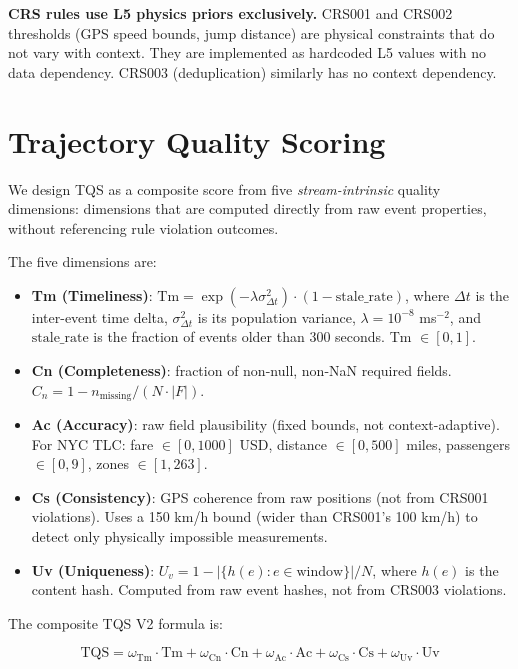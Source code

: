 \textbf{CRS rules use L5 physics priors exclusively.} CRS001 and CRS002
thresholds (GPS speed bounds, jump distance) are physical constraints that
do not vary with context. They are implemented as hardcoded L5 values
with no data dependency. CRS003 (deduplication) similarly has no context
dependency.

\section{Trajectory Quality Scoring}
\label{sec:tqs-design}

We design TQS as a composite score from five \textit{stream-intrinsic}
quality dimensions: dimensions that are computed directly from raw event
properties, without referencing rule violation outcomes.

The five dimensions are:

\begin{itemize}
  \item \textbf{Tm (Timeliness)}: $\text{Tm} = \exp(-\lambda \sigma^{2}_{\Delta t})
        \cdot (1 - \text{stale\_rate})$, where $\Delta t$ is the inter-event
        time delta, $\sigma^{2}_{\Delta t}$ is its population variance,
        $\lambda = 10^{-8}$ ms$^{-2}$, and $\text{stale\_rate}$ is the
        fraction of events older than 300 seconds. Tm $\in [0, 1]$.
  \item \textbf{Cn (Completeness)}: fraction of non-null, non-NaN required
        fields. $C_n = 1 - n_{\text{missing}} / (N \cdot |F|)$.
  \item \textbf{Ac (Accuracy)}: raw field plausibility (fixed bounds, not
        context-adaptive). For NYC TLC: fare $\in [0, 1000]$ USD, distance
        $\in [0, 500]$ miles, passengers $\in [0, 9]$, zones $\in [1, 263]$.
  \item \textbf{Cs (Consistency)}: GPS coherence from raw positions (not
        from CRS001 violations). Uses a 150 km/h bound (wider than
        CRS001's 100 km/h) to detect only physically impossible measurements.
  \item \textbf{Uv (Uniqueness)}: $U_v = 1 - |\{h(e) : e \in \text{window}\}| / N$,
        where $h(e)$ is the content hash. Computed from raw event hashes,
        not from CRS003 violations.
\end{itemize}

The composite TQS V2 formula is:

\begin{equation}
\text{TQS} = \omega_{\text{Tm}} \cdot \text{Tm}
            + \omega_{\text{Cn}} \cdot \text{Cn}
            + \omega_{\text{Ac}} \cdot \text{Ac}
            + \omega_{\text{Cs}} \cdot \text{Cs}
            + \omega_{\text{Uv}} \cdot \text{Uv}
\end{equation}

